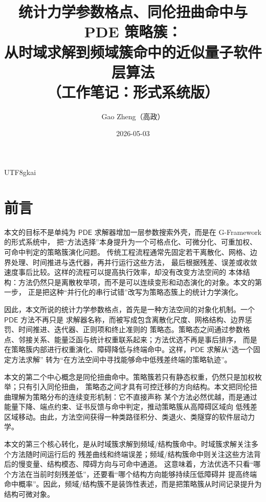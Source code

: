 \documentclass[12pt]{article}
\newcommand{\GFramework}{\textsf{G-Framework}}
\newcommand{\PDE}{\mathsf{PDE}}
\begin{document}
\begin{CJK*}{UTF8}{gkai}

\title{统计力学参数格点、同伦扭曲命中与 PDE 策略簇：\\从时域求解到频域簇命中的近似量子软件层算法\\（工作笔记：形式系统版）}
\author{Gao Zheng（高政）}
\date{2026-05-03}
\maketitle

\section*{前言}

本文的目标不是单纯为 \(\PDE\) 求解器增加一层参数搜索外壳，而是在 \GFramework{} 的形式系统中，
把“方法选择”本身提升为一个可格点化、可微分化、可重加权、可命中判定的策略簇演化问题。
传统工程流程通常先固定若干离散化、网格、边界处理、时间推进与迭代器，再并行运行这些方法，
最后根据残差、误差或收敛速度事后比较。这样的流程可以提高执行效率，却没有改变方法空间的
本体结构：方法仍然只是离散枚举项，而不是可以连续变形和动态演化的对象。本文的第一步，
正是把这种“并行化的串行试错”改写为策略态簇上的统计力学演化。

因此，本文所说的统计力学参数格点，首先是一种方法空间的对象化机制。一个 \(\PDE\) 方法不再只是
求解器名称，而被写成包含离散化尺度、网格结构、边界惩罚、时间推进、迭代器、正则项和终止准则的
策略态。策略态之间通过参数格点、邻接关系、能量泛函与统计权重联系起来；方法优选不再是事后排序，
而是在策略簇内部进行权重演化、障碍降低与终端命中。这样，\(\PDE\) 求解从“选一个固定方法求解”
转为“在方法空间中寻找能够命中低残差终端的策略轨迹”。

本文的第二个中心概念是同伦扭曲命中。策略簇若只有静态权重，仍然只是加权枚举；只有引入同伦扭曲，
策略态之间才具有可控迁移的方向结构。本文把同伦扭曲理解为策略分布的连续变形机制：它不直接声称
某个方法必然优越，而是通过能量下降、端点约束、证书反馈与命中判定，推动策略簇从高障碍区域向
低残差区域移动。由此，方法空间获得一种类路径积分、类退火、类隧穿的软件层动力学。

本文的第三个核心转化，是从时域簇求解到频域/结构簇命中。时域簇求解关注多个方法随时间运行后的
残差曲线和终端误差；频域/结构簇命中则关注这些方法背后的慢变量、结构模态、障碍方向与可命中通道。
这意味着，方法优选不只看“哪个方法在当前时刻残差低”，还要看“哪个结构方向能够持续压低障碍并
提高终端命中概率”。因此，频域/结构簇不是装饰性表述，而是把策略簇从时间记录提升为结构可微对象。


\end{CJK*}
\end{document}
